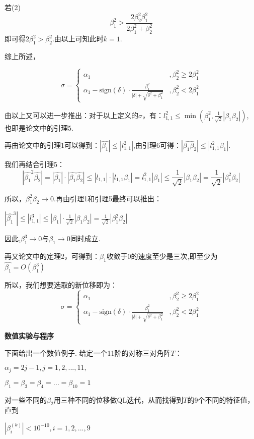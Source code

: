 \documentclass[12pt]{ctexart}
\begin{document}
若(2)\[\beta_1^{2}>\frac{2\beta_2^2\beta_1^2 }{2\beta_1^2 + \beta_2^2}\] 即可得$2\beta_1^{2}>\beta_2^{2}$.由以上可知此时$k=1$.

综上所述，

\[
\sigma =
\begin{cases}
\alpha_1 & , \beta_2^2 \geq 2\beta_1^2 \\
\alpha_1 - \mathrm{sign}(\delta) \cdot
\frac{\beta_1^2}{\left\lvert\delta\right\rvert + \sqrt{\delta^2 +
    \beta_1^2}} & , \beta_2^2 < 2\beta_1^2
\end{cases}
\]



由以上又可以进一步推出：对于以上定义的$\sigma$，有：$l_{1,1}^2\leq\min(\beta_1^2,\frac{1}{\sqrt{2}}|\beta_1\beta_2|)$,
也即是论文中的引理5.

再由论文中的引理1可以得到：$|\hat{\beta_1}|\leq|l_{1,1}^2|$,由引理6可得：$|\hat{\beta_1\beta_2}|\leq|l_{1,1}^2\beta_1|$.

我们再结合引理5：
\[
|\hat{\beta_1}^2\hat{\beta_2}|=|\hat{\beta_1}|\cdot|\hat{\beta_1}\hat{\beta_2}|\leq|l_{1,1}|\cdot|l_{1,1}\beta_1|
=l_{1,1}^2|\beta_1|\leq\frac{1}{\sqrt{2}}|\beta_1\beta_2|=\frac{1}{\sqrt{2}}|\beta_1^2\beta_2|
\]

所以，$\beta_1^2\beta_2\rightarrow0$.再由引理1和引理5最终可以推出：
\begin{center}
$|\hat{\beta_1}^3|\leq|l_{1,1}^3|\leq|\beta_1|\cdot\frac{1}{\sqrt{2}}|\beta_1\beta_2|=\frac{1}{\sqrt{2}}|\beta_1^2\beta_2|$
\end{center}

因此,$\beta_1^3\rightarrow0$与$\beta_1\rightarrow0$同时成立.

再又论文中的定理2，可得到：$\beta_1$收敛于0的速度至少是三次,即至少为$\hat{\beta_1}=O(\beta_1^3)$

所以，我们想要选取的新位移即为：
\[
\sigma =
\begin{cases}
\alpha_1 & , \beta_2^2 \geq 2\beta_1^2 \\
\alpha_1 - \mathrm{sign}(\delta) \cdot
\frac{\beta_1^2}{\left\lvert\delta\right\rvert + \sqrt{\delta^2 +
    \beta_1^2}} & , \beta_2^2 < 2\beta_1^2
\end{cases}
\]

\begin{center}
\textbf{数值实验与程序}
\end{center}

下面给出一个数值例子.
给定一个11阶的对称三对角阵$T$：
\begin{center}
$\alpha_j=2j-1,j=1,2,...,11,$
\end{center}
\begin{center}
$\beta_1=\beta_3=\beta_4=...=\beta_{10}=1$
\end{center}
对一些不同的$\beta_2$用三种不同的位移做QL迭代，从而找得到$T$的9个不同的特征值，直到
\begin{center}
$|\beta_i^{(k)}|<10^{-10},i=1,2,...,9$
\end{center}
\end{document}
